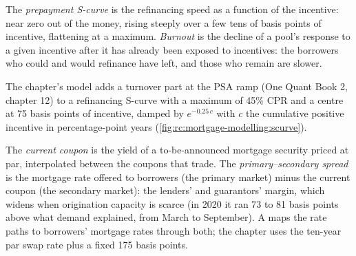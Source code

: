 \begin{definition}\label{def:rc:mortgage-modelling:scurve}
The \emph{prepayment S-curve} is the refinancing speed as a
function of the incentive: near zero out of the money, rising steeply over a few tens
of basis points of incentive, flattening at a maximum. \emph{Burnout}
is the decline of a pool's response to a given incentive after it has already been
exposed to incentives: the borrowers who could and would refinance have left, and
those who remain are slower.
\end{definition}

The chapter's model adds a turnover part at the PSA ramp (One Quant Book 2, chapter
12) to a refinancing S-curve with a maximum of 45\% CPR and a centre at 75 basis
points of incentive, damped by  $e^{-0.25\,c}$ with $c$ the cumulative positive
incentive in percentage-point years
(\cref{fig:rc:mortgage-modelling:scurve}).

\begin{definition}\label{def:rc:mortgage-modelling:cc}
The \emph{current coupon} is the yield of a to-be-announced
mortgage security priced at par, interpolated between the coupons that trade. The
\emph{primary--secondary spread} is the mortgage rate
offered to borrowers (the primary market) minus the current coupon (the secondary
market): the lenders' and guarantors' margin, which widens when origination capacity
is scarce (in 2020 it ran 73 to 81 basis points above what demand explained, from March to September). A  maps the rate paths to borrowers' mortgage rates
through both; the chapter uses the ten-year par swap rate plus a fixed 175 basis
points.
\end{definition}

\label{lst:rc:mortgage-modelling:model}

